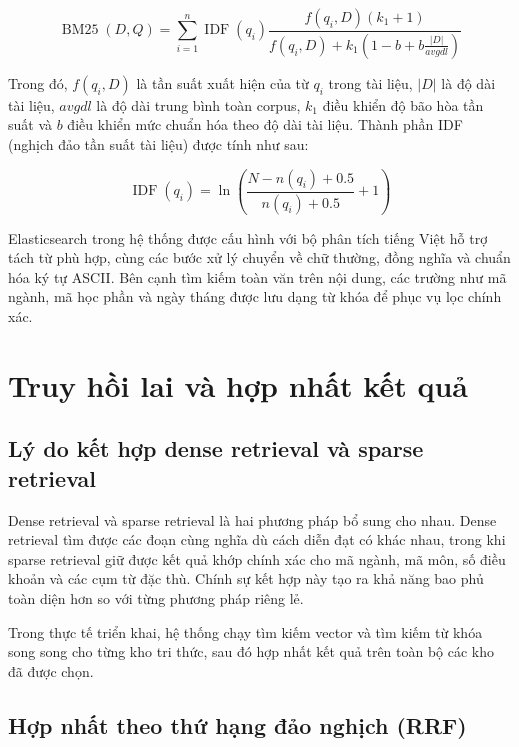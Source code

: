 \documentclass[../DoAn.tex]{subfiles}
\begin{document}
\begin{equation}
\operatorname{BM25}(D,Q) =
\sum_{i=1}^{n}
\operatorname{IDF}(q_i)
\frac{f(q_i,D)(k_1+1)}
{f(q_i,D)+k_1\left(1-b+b\frac{|D|}{avgdl}\right)}
\end{equation}

Trong đó, $f(q_i,D)$ là tần suất xuất hiện của từ $q_i$ trong tài liệu, $|D|$
là độ dài tài liệu, $avgdl$ là độ dài trung bình toàn corpus, $k_1$ điều khiển
độ bão hòa tần suất và $b$ điều khiển mức chuẩn hóa theo độ dài tài liệu.
Thành phần IDF (nghịch đảo tần suất tài liệu) được tính như sau:

\begin{equation}
\operatorname{IDF}(q_i) =
\ln\left(
\frac{N-n(q_i)+0.5}{n(q_i)+0.5}+1
\right)
\end{equation}

Elasticsearch trong hệ thống được cấu hình với bộ phân tích tiếng Việt hỗ trợ
tách từ phù hợp, cùng các bước xử lý chuyển về chữ thường, đồng nghĩa và chuẩn
hóa ký tự ASCII. Bên cạnh tìm kiếm toàn văn trên nội dung, các trường như mã
ngành, mã học phần và ngày tháng được lưu dạng từ khóa để phục vụ lọc chính xác.

\section{Truy hồi lai và hợp nhất kết quả}

\subsection{Lý do kết hợp dense retrieval và sparse retrieval}

Dense retrieval và sparse retrieval là hai phương pháp bổ sung cho nhau. Dense
retrieval tìm được các đoạn cùng nghĩa dù cách diễn đạt có khác nhau, trong
khi sparse retrieval giữ được kết quả khớp chính xác cho mã ngành, mã môn, số
điều khoản và các cụm từ đặc thù. Chính sự kết hợp này tạo ra khả năng bao phủ
toàn diện hơn so với từng phương pháp riêng lẻ.

Trong thực tế triển khai, hệ thống chạy tìm kiếm vector và tìm kiếm từ khóa
song song cho từng kho tri thức, sau đó hợp nhất kết quả trên toàn bộ các kho
đã được chọn.

\subsection{Hợp nhất theo thứ hạng đảo nghịch (RRF)}
\end{document}
